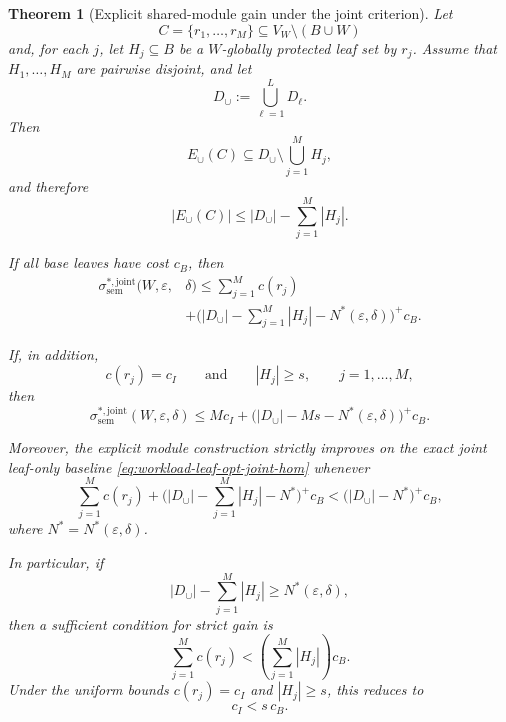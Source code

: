 \documentclass[journal]{IEEEtran}
\newtheorem{theorem}{Theorem}[section]
\numberwithin{equation}{section}
\begin{document}
\begin{theorem}[Explicit shared-module gain under the joint criterion]
\label{thm:workload-shared-module-gain}
Let
\[
  C=\{r_1,\ldots,r_M\}\subseteq V_W\setminus(B\cup W)
\]
and, for each \(j\), let \(H_j\subseteq B\) be a \(W\)-globally protected leaf
set by \(r_j\).  Assume that \(H_1,\ldots,H_M\) are pairwise disjoint, and let
\[
  D_{\cup}:=\bigcup_{\ell=1}^{L}D_\ell.
\]
Then
\begin{equation}
  E_{\cup}(C)
  \subseteq
  D_{\cup}\setminus\bigcup_{j=1}^{M}H_j,
\label{eq:workload-protected-union}
\end{equation}
and therefore
\begin{equation}
  |E_{\cup}(C)|
  \le
  |D_{\cup}|-\sum_{j=1}^{M}|H_j|.
\label{eq:workload-protected-count}
\end{equation}

If all base leaves have cost \(c_B\), then
\begin{equation}
  \begin{split}
    \sigma_{\mathrm{sem}}^{*,\mathrm{joint}}
    (W, \varepsilon, & \delta)
    \le
    \sum_{j=1}^{M}c(r_j)\\
    & +
    \biggl(
      |D_{\cup}|-\sum_{j=1}^{M}|H_j|-N^*(\varepsilon,\delta)
    \biggr)^{+}c_B.
  \end{split}
\label{eq:workload-protected-achievable}
\end{equation}

If, in addition,
\[
  c(r_j)=c_I
  \qquad\text{and}\qquad
  |H_j|\ge s,
  \qquad j=1,\ldots,M,
\]
then
\begin{equation}
  \sigma_{\mathrm{sem}}^{*,\mathrm{joint}}
  (W,\varepsilon,\delta)
  \le
  Mc_I
  +
  \bigl(
    |D_{\cup}|-Ms-N^*(\varepsilon,\delta)
  \bigr)^+c_B.
\label{eq:workload-protected-achievable-hom}
\end{equation}

Moreover, the explicit module construction strictly improves on the exact joint
leaf-only baseline \eqref{eq:workload-leaf-opt-joint-hom} whenever
\begin{equation}
  \sum_{j=1}^{M}c(r_j)
  +
  \biggl(
    |D_{\cup}|
    -\sum_{j=1}^{M}|H_j|
    -N^*
  \biggr)^+c_B
  <
  \bigl(|D_{\cup}|-N^*\bigr)^+c_B,
\label{eq:workload-protected-gain}
\end{equation}
where \(N^*=N^*(\varepsilon,\delta)\).

In particular, if
\[
  |D_{\cup}|-\sum_{j=1}^{M}|H_j|
  \ge
  N^*(\varepsilon,\delta),
\]
then a sufficient condition for strict gain is
\begin{equation}
  \sum_{j=1}^{M}c(r_j)
  <
  \left(
    \sum_{j=1}^{M}|H_j|
  \right)c_B.
\label{eq:workload-protected-gain-simple}
\end{equation}
Under the uniform bounds \(c(r_j)=c_I\) and \(|H_j|\ge s\), this reduces to
\begin{equation}
  c_I<s\,c_B.
\label{eq:workload-protected-gain-uniform}
\end{equation}
\end{theorem}
\end{document}

